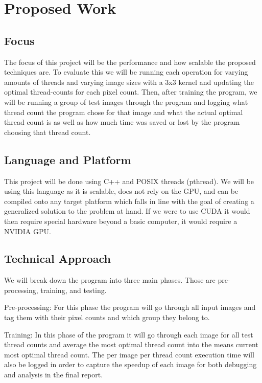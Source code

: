 \documentclass{article}
\begin{document}
\pagebreak

\section{Proposed Work}
\subsection{Focus}

The focus of this project will be the performance and how scalable the proposed techniques are.  To evaluate this we will be running each operation for varying amounts of threads and varying image sizes with a 3x3 kernel and updating the optimal thread-counts for each pixel count.  Then, after training the program, we will be running a group of test images through the program and logging what thread count the program chose for that image and what the actual optimal thread count is as well as how much time was saved or lost by the program choosing that thread count.

\subsection{Language and Platform}

This project will be done using C++ and POSIX threads (pthread).  We will be using this language as it is scalable, does not rely on the GPU, and can be compiled onto any target platform which falls in line with the goal of creating a generalized solution to the problem at hand.  If we were to use CUDA it would then require special hardware beyond a basic computer, it would require a NVIDIA GPU.

\subsection{Technical Approach}

We will break down the program into three main phases.  Those are pre-processing, training, and testing.

Pre-processing:  For this phase the program will go through all input images and tag them with their pixel counts and which group they belong to.

Training: In this phase of the program it will go through each image for all test thread counts and average the most optimal thread count into the means current most optimal thread count.  The per image per thread count execution time will also be logged in order to capture the speedup of each image for both debugging and analysis in the final report.
\end{document}
